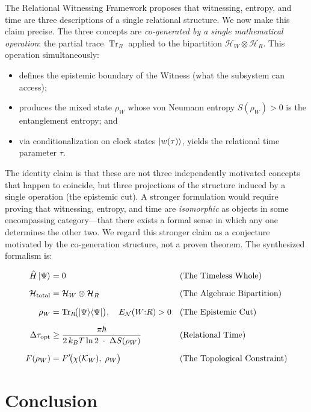 \documentclass[12pt, a4paper]{article}
\begin{document}
The Relational Witnessing Framework proposes that witnessing, entropy, and time are three descriptions of a single relational structure. We now make this claim precise. The three concepts are \emph{co-generated by a single mathematical operation}: the partial trace $\operatorname{Tr}_R$ applied to the bipartition $\mathcal{H}_W \otimes \mathcal{H}_R$. This operation simultaneously:
\begin{itemize}
    \item defines the epistemic boundary of the Witness (what the subsystem can access);
    \item produces the mixed state $\rho_W$ whose von Neumann entropy $S(\rho_W) > 0$ is the entanglement entropy; and
    \item via conditionalization on clock states $\ket{w(\tau)}$, yields the relational time parameter $\tau$.
\end{itemize}

\noindent The identity claim is that these are not three independently motivated concepts that happen to coincide, but three projections of the structure induced by a single operation (the epistemic cut). A stronger formulation would require proving that witnessing, entropy, and time are \emph{isomorphic} as objects in some encompassing category---that there exists a formal sense in which any one determines the other two. We regard this stronger claim as a conjecture motivated by the co-generation structure, not a proven theorem. The synthesized formalism is:

\begin{align}
\hat{H}\ket{\Psi} &= 0 &&\text{(The Timeless Whole)} \label{eq:syn1}\\[6pt]
\mathcal{H}_{\mathrm{total}} &= \mathcal{H}_W \otimes \mathcal{H}_R &&\text{(The Algebraic Bipartition)} \label{eq:syn2}\\[6pt]
\rho_W &= \operatorname{Tr}_R\!\bigl(\ket{\Psi}\!\bra{\Psi}\bigr),\quad E_{\mathcal{N}}(W{:}R) > 0 &&\text{(The Epistemic Cut)} \label{eq:syn3}\\[6pt]
\Delta\tau_{\mathrm{opt}} &\geq \frac{\pi\hbar}{2\,k_BT\ln 2 \;\cdot\; \Delta S(\rho_W)} &&\text{(Relational Time)} \label{eq:syn4}\\[6pt]
F(\rho_W) &= F'\!\bigl(\chi(\mathcal{K}_W),\; \rho_W\bigr) &&\text{(The Topological Constraint)} \label{eq:syn5}
\end{align}

\section{Conclusion}
\end{document}
